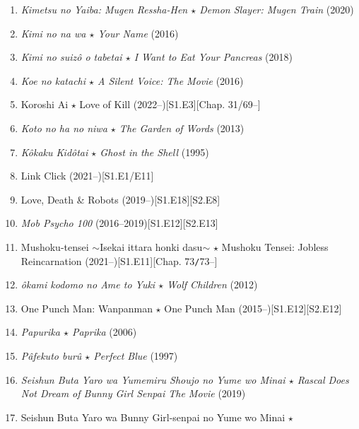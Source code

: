 \documentclass{article}
\begin{document}
\begin{enumerate}
    \item \textit{Kimetsu no Yaiba: Mugen Ressha-Hen $\star$ Demon Slayer: Mugen Train} (2020)
    \item \textit{Kimi no na wa $\star$ Your Name} (2016)
    \item \textit{Kimi no suiz\^o o tabetai $\star$ I Want to Eat Your Pancreas} (2018)
    \item \textit{Koe no katachi $\star$ A Silent Voice: The Movie} (2016)
    \item Koroshi Ai $\star$ Love of Kill (2022--)\hfill[S1.E3][Chap. 31/69--]
    \item \textit{Koto no ha no niwa $\star$ The Garden of Words} (2013)
    \item \textit{K\^okaku Kid\^otai $\star$ Ghost in the Shell} (1995)
    \item Link Click (2021--)\hfill[S1.E1/E11]
    \item Love, Death \& Robots (2019--)\hfill[S1.E18][S2.E8]
    \item \textit{Mob Psycho 100} (2016--2019)\hfill[S1.E12][S2.E13]
    \item Mushoku-tensei $\sim$Isekai ittara honki dasu$\sim$ $\star$ Mushoku Tensei: Jobless Reincarnation (2021--)\hfill[S1.E11][Chap. 73\texttt{/}73--]
    \item \textit{\^okami kodomo no Ame to Yuki $\star$ Wolf Children} (2012)
    \item One Punch Man: Wanpanman $\star$ One Punch Man (2015--)\hfill[S1.E12][S2.E12]
    \item \textit{Papurika $\star$ Paprika} (2006)
    \item \textit{Pâfekuto burû $\star$ Perfect Blue} (1997)
    \item \textit{Seishun Buta Yaro wa Yumemiru Shoujo no Yume wo Minai $\star$ Rascal Does Not Dream of Bunny Girl Senpai The Movie} (2019)
    \item Seishun Buta Yaro wa Bunny Girl-senpai no Yume wo Minai $\star$
    

\end{enumerate}
\end{document}
